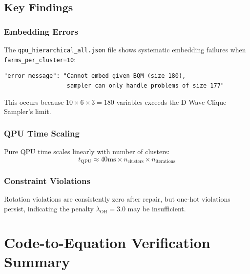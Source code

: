 \documentclass[11pt,a4paper]{article}
\begin{document}
\subsection{Key Findings}

\subsubsection{Embedding Errors}

The \texttt{qpu\_hierarchical\_all.json} file shows systematic embedding failures when \texttt{farms\_per\_cluster=10}:
\begin{verbatim}
"error_message": "Cannot embed given BQM (size 180), 
                  sampler can only handle problems of size 177"
\end{verbatim}

This occurs because $10 \times 6 \times 3 = 180$ variables exceeds the D-Wave Clique Sampler's limit.

\subsubsection{QPU Time Scaling}

Pure QPU time scales linearly with number of clusters:
\begin{equation}
t_{\text{QPU}} \approx 40\text{ms} \times n_{\text{clusters}} \times n_{\text{iterations}}
\end{equation}

\subsubsection{Constraint Violations}

Rotation violations are consistently zero after repair, but one-hot violations persist, indicating the penalty $\lambda_{\text{OH}}=3.0$ may be insufficient.

\section{Code-to-Equation Verification Summary}
\end{document}
